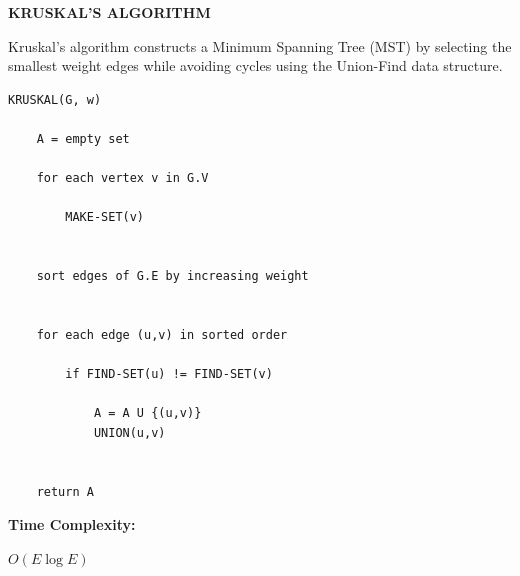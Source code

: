 \documentclass[a4paper,12pt]{article}
\begin{document}
\begin{tcolorbox}[
    colback=gray!30,
    colframe=black,
    boxrule=1pt,
    arc=0mm
]

\begin{tcolorbox}[
    colback=gray!10,
    colframe=black,
    arc=0mm
]
\centering
{\Huge\bfseries KRUSKAL'S ALGORITHM}
\end{tcolorbox}


\begin{tcolorbox}[
    colback=gray!10,
    colframe=black,
    arc=0mm
]
\small
Kruskal's algorithm constructs a Minimum Spanning Tree (MST) by selecting
the smallest weight edges while avoiding cycles using the Union-Find data structure.
\end{tcolorbox}


\begin{tcolorbox}[
    colback=black!5,
    colframe=black,
    arc=0mm,
    title=Pseudo-code
]
\tiny
\begin{lstlisting}
KRUSKAL(G, w)

    A = empty set

    for each vertex v in G.V

        MAKE-SET(v)


    sort edges of G.E by increasing weight


    for each edge (u,v) in sorted order

        if FIND-SET(u) != FIND-SET(v)

            A = A U {(u,v)}
            UNION(u,v)


    return A
\end{lstlisting}
\end{tcolorbox}


\begin{tcolorbox}[
    colback=cyan!20,
    colframe=black,
    arc=0mm
]
\small
\textbf{Time Complexity:}

$O(E\log E)$


\end{tcolorbox}
\end{tcolorbox}
\end{document}
